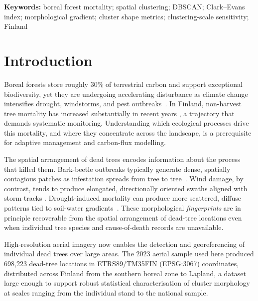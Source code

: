 \documentclass[twocolumn]{article}
\begin{document}
\textbf{Keywords:} boreal forest mortality; spatial clustering; DBSCAN; Clark--Evans index;
morphological gradient; cluster shape metrics; clustering-scale sensitivity; Finland

\section{Introduction}
\label{sec:intro}

Boreal forests store roughly 30\% of terrestrial carbon and support exceptional
biodiversity, yet they are undergoing accelerating disturbance as climate change intensifies
drought, windstorms, and pest outbreaks~\citep{bradshaw2015global, allen2010global}.
In Finland, non-harvest tree mortality has increased substantially in recent years
\citep{junttila2024significant}, a trajectory that demands systematic monitoring. Understanding which
ecological processes drive this mortality, and where they concentrate across the
landscape, is a prerequisite for adaptive management and carbon-flux modelling.

The spatial arrangement of dead trees encodes information about the process that killed them.
Bark-beetle outbreaks typically generate dense, spatially contagious patches as infestation
spreads from tree to tree~\citep{raffa2008cross, hlasny2021bark}. Wind damage, by contrast,
tends to produce elongated, directionally oriented swaths aligned with storm tracks
\citep{gardiner2013wind, gregow2011combined}. Drought-induced mortality can produce more
scattered, diffuse patterns tied to soil-water gradients~\citep{mcdowell2008mechanisms}.
These morphological \textit{fingerprints} are in principle recoverable from the spatial arrangement of dead-tree
locations even when individual tree species and cause-of-death records are unavailable.

High-resolution aerial imagery now enables the detection and georeferencing of individual
dead trees over large areas. The 2023 aerial sample used here produced 698,223
dead-tree locations in ETRS89/TM35FIN (EPSG:3067) coordinates, distributed across Finland from the
southern boreal zone to Lapland, a dataset large enough to support robust statistical
characterisation of cluster morphology at scales ranging from the individual stand to the
national sample.
\end{document}
